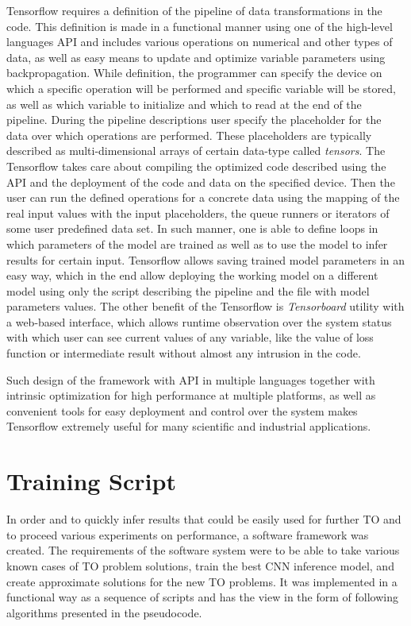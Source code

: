 Tensorflow requires a definition of the pipeline of data transformations in the code.
This definition is made in a functional manner using one of the high-level languages API and includes various operations on numerical and other types of data, as well as easy means to update and optimize variable parameters using backpropagation. 
While definition, the programmer can specify the device on which a specific operation will be performed and specific variable will be stored, as well as which variable to initialize and which to read at the end of the pipeline. 
During the pipeline descriptions user specify the placeholder for the data over which operations are performed. 
These placeholders are typically described as multi-dimensional arrays of certain data-type called \emph{tensors}.
The Tensorflow takes care about compiling the optimized code described using the API and the deployment of the code and data on the specified device. 
Then the user can run the defined operations for a concrete data using the mapping of the real input values with the input placeholders, the queue runners or iterators of some user predefined data set.
In such manner, one is able to define loops in which parameters of the model are trained as well as to use the model to infer results for certain input.
Tensorflow allows saving trained model parameters in an easy way, which in the end allow deploying the working model on a different model using only the script describing the pipeline and the file with model parameters values.
The other benefit of the Tensorflow is \emph{Tensorboard} utility with a web-based interface, which allows runtime observation over the system status with which user can see current values of any variable, like the value of loss function or intermediate result without almost any intrusion in the code.
\medskip

Such design of the framework with API in multiple languages together with intrinsic optimization for high performance at multiple platforms, as well as convenient tools for easy deployment and control over the system makes Tensorflow extremely useful for many scientific and industrial applications.

\section{Training Script}

In order and to quickly infer results that could be easily used for further TO and to proceed various experiments on performance, a software framework was created. 
The requirements of the software system were to be able to take various known cases of TO problem solutions, train the best CNN inference model, and create approximate solutions for the new TO problems.
It was implemented in a functional way as a sequence of scripts and has the view in the form of following algorithms presented in the pseudocode. 
\medskip

